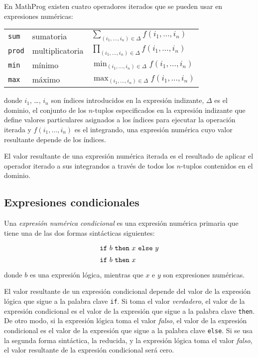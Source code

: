 \documentclass[11pt,spanish]{report}
\begin{document}
En MathProg existen cuatro operadores iterados que se pueden usar en expresiones numéricas:

{\def\arraystretch{2}
\noindent\hfil
\begin{tabular}{@{}lll@{}}
{\tt sum}&sumatoria&$\displaystyle\sum_{(i_1,\dots,i_n)\in\Delta}
f(i_1,\dots,i_n)$\\
{\tt prod}&multiplicatoria&$\displaystyle\prod_{(i_1,\dots,i_n)\in\Delta}
f(i_1,\dots,i_n)$\\
{\tt min}&mínimo&$\displaystyle\min_{(i_1,\dots,i_n)\in\Delta}
f(i_1,\dots,i_n)$\\
{\tt max}&máximo&$\displaystyle\max_{(i_1,\dots,i_n)\in\Delta}
f(i_1,\dots,i_n)$\\
\end{tabular}
}

\noindent donde $i_1$, \dots, $i_n$ son índices introducidos en la expresión indizante, $\Delta$ es el dominio, el conjunto de los $n$-tuplos especificados en la expresión indizante que define valores particulares asignados a los índices para ejecutar la operación iterada y $f(i_1,\dots,i_n)$ es el integrando, una expresión numérica cuyo valor resultante depende de los índices.

El valor resultante de una expresión numérica iterada es el resultado de aplicar el operador iterado a sus integrandos a través de todos los $n$-tuplos contenidos en el dominio.

\subsection{Expresiones condicionales}
\label{ifthen}

Una {\it expresión numérica condicional} es una expresión numérica primaria que tiene una de las dos formas sintácticas siguientes:
$$
{\def\arraystretch{1.4}
\begin{array}{l}
\mbox{{\tt if} $b$ {\tt then} $x$ {\tt else} $y$}\\
\mbox{{\tt if} $b$ {\tt then} $x$}\\
\end{array}
}
$$
donde $b$ es una expresión lógica, mientras que $x$ e $y$ son expresiones numéricas.

El valor resultante de un expresión condicional depende del valor de la expresión lógica que sigue a la palabra clave {\tt if}. Si toma el valor {\it verdadero}, el valor de la expresión condicional es el valor de la expresión que sigue a la palabra clave {\tt then}. De otro modo, si la expresión lógica toma el valor {\it falso}, el valor de la expresión condicional es el valor de la expresión que sigue a la palabra clave {\tt else}. Si se usa la segunda forma sintáctica, la reducida, y la expresión lógica toma el valor {\it falso}, el valor resultante de la expresión condicional será cero.
\end{document}
